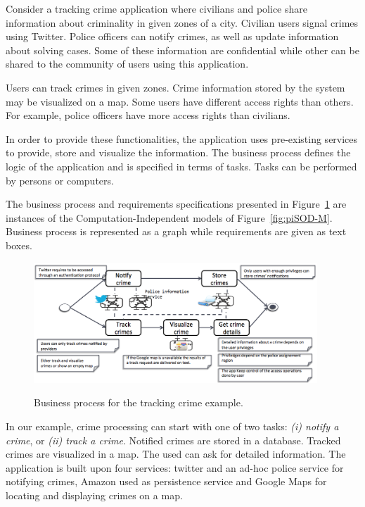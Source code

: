 
Consider a tracking crime application where civilians and police share information about criminality in given zones of a city. 
Civilian users signal crimes using Twitter.
Police officers can notify crimes, as well as update information about solving cases.
Some of these information are confidential while other can be shared
to the community of users using this application. 

Users can track crimes in given zones. 
Crime information stored by the system may be visualized on a map. 
Some users have different access rights than others.
For example, police officers have more access rights than civilians.


In order to provide these functionalities, the application uses pre-existing services to provide, store and visualize the information.
The business process defines the logic of the application and is specified in terms of tasks. 
Tasks can be performed by persons or computers. 

The business process and requirements specifications presented in Figure~\ref{fig:constraints} are instances of the Computation-Independent models of Figure~\ref{fig:piSOD-M}.
Business process is represented as a graph while requirements are given as text boxes.
\begin{figure}[ht!]
\centering
{\label{fig:trans06}\includegraphics[width=0.95\textwidth]{figs/constraints}}
~ %
\caption{Business process for the tracking crime example.}
\label{fig:constraints}
\end{figure}

In our example, crime processing can start with one of two tasks: \textit{(i) notify a crime}, or \textit{(ii) track a crime}.
Notified crimes are stored in a database. 
Tracked crimes are visualized in a map.
The used can ask for detailed information. 
The application is built upon four services: \textsf{twitter} and an \textsf{ad-hoc police service} for notifying crimes, \textsf{Amazon} used as  persistence service and  \textsf{Google Maps} for locating and displaying crimes on a map.

